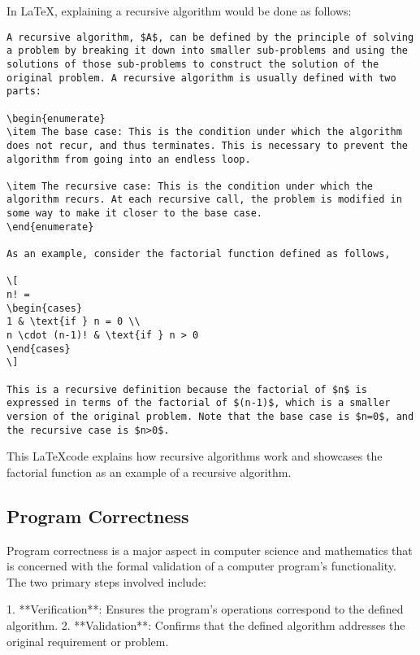 In \LaTeX, explaining a recursive algorithm would be done as follows:

\begin{verbatim}
A recursive algorithm, $A$, can be defined by the principle of solving a problem by breaking it down into smaller sub-problems and using the solutions of those sub-problems to construct the solution of the original problem. A recursive algorithm is usually defined with two parts:

\begin{enumerate}
\item The base case: This is the condition under which the algorithm does not recur, and thus terminates. This is necessary to prevent the algorithm from going into an endless loop.

\item The recursive case: This is the condition under which the algorithm recurs. At each recursive call, the problem is modified in some way to make it closer to the base case.
\end{enumerate}

As an example, consider the factorial function defined as follows,

\[
n! = 
\begin{cases} 
1 & \text{if } n = 0 \\
n \cdot (n-1)! & \text{if } n > 0 
\end{cases}
\]

This is a recursive definition because the factorial of $n$ is expressed in terms of the factorial of $(n-1)$, which is a smaller version of the original problem. Note that the base case is $n=0$, and the recursive case is $n>0$.
\end{verbatim}

This \LaTeX code explains how recursive algorithms work and showcases the factorial function as an example of a recursive algorithm.

\subsection{Program Correctness}
Program correctness is a major aspect in computer science and mathematics that is concerned with the formal validation of a computer program's functionality. The two primary steps involved include: 

1. **Verification**: Ensures the program's operations correspond to the defined algorithm.
2. **Validation**: Confirms that the defined algorithm addresses the original requirement or problem.

